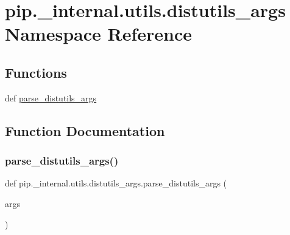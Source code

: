 \hypertarget{namespacepip_1_1__internal_1_1utils_1_1distutils__args}{}\section{pip.\+\_\+internal.\+utils.\+distutils\+\_\+args Namespace Reference}
\label{namespacepip_1_1__internal_1_1utils_1_1distutils__args}
\subsection*{Functions}
\begin{DoxyCompactItemize}
\item 
def \hyperlink{namespacepip_1_1__internal_1_1utils_1_1distutils__args_a5af29e0d46985fbd523a683a757c907c}{parse\+\_\+distutils\+\_\+args}
\end{DoxyCompactItemize}


\subsection{Function Documentation}
\mbox{\label{namespacepip_1_1__internal_1_1utils_1_1distutils__args_a5af29e0d46985fbd523a683a757c907c}} 
\subsubsection{\texorpdfstring{parse\+\_\+distutils\+\_\+args()}{parse\_distutils\_args()}}
{\footnotesize\ttfamily def pip.\+\_\+internal.\+utils.\+distutils\+\_\+args.\+parse\+\_\+distutils\+\_\+args (\begin{DoxyParamCaption}\item[{}]{args }\end{DoxyParamCaption})}

